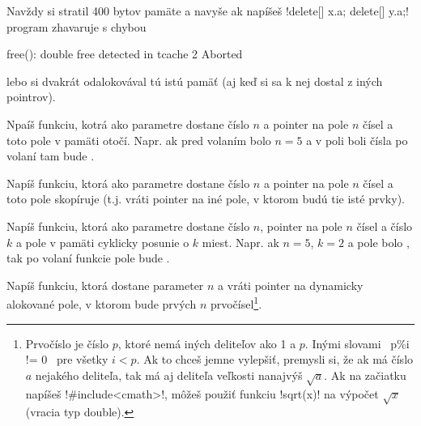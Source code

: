 
Navždy si stratil 400 bytov pamäte a navyše ak napíšeš \prg!delete[] x.a; delete[] y.a;!
program zhavaruje s chybou

\begin{outputBox}
free(): double free detected in tcache 2
Aborted
\end{outputBox}

lebo si dvakrát odalokovával tú istú pamäť (aj keď si sa k nej dostal z iných pointrov).

\begin{uloha}
  Npaíš funkciu, kotrá ako parametre dostane číslo $n$ a pointer na  pole $n$
  čísel a toto pole v pamäti otočí. Napr. ak pred volaním bolo $n=5$
  a v poli boli čísla  po volaní tam bude .
\end{uloha}

\begin{uloha}
  \label{uloha:arraycopy}
  Napíš funkciu, ktorá ako parametre dostane číslo $n$ a pointer na pole $n$
  čísel a toto pole skopíruje (t.j. vráti pointer na iné pole, v ktorom budú
  tie isté prvky).
\end{uloha}

\begin{uloha}
  Napíš funkciu, ktorá ako parametre dostane číslo $n$, pointer na  pole $n$
  čísel a číslo $k$ a pole v pamäti cyklicky posunie o $k$ miest.
  Napr. ak $n=5$, $k=2$ a pole bolo , tak po volaní funkcie
  pole bude .
\end{uloha}

\begin{uloha}
  \label{uloha:primetest}
  Napíš funkciu, ktorá dostane parameter $n$ a vráti pointer na dynamicky alokované
  pole, v ktorom bude prvých $n$ prvočísel\footnote{%
    Prvočíslo je číslo $p$, ktoré nemá iných deliteľov ako 1 a $p$. Inými slovami
    \prg~p\%i != 0~ pre všetky $i<p$. Ak to chceš jemne vylepšiť, premysli si,
    že ak má číslo $a$ nejakého deliteľa, tak má aj deliteľa veľkosti 
    nanajvýš $\sqrt{a}$. Ak na začiatku napíšeš \prg!#include<cmath>!, môžeš
    použiť funkciu \prg!sqrt(x)! na výpočet $\sqrt{x}$ (vracia typ double).
    }.
\end{uloha}


